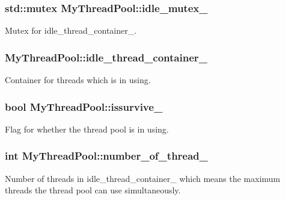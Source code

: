 \subsubsection[{\texorpdfstring{idle\+\_\+mutex\+\_\+}{idle_mutex_}}]{\setlength{\rightskip}{0pt plus 5cm}std\+::mutex My\+Thread\+Pool\+::idle\+\_\+mutex\+\_\+\hspace{0.3cm}{\ttfamily [private]}}\hypertarget{classMyThreadPool_a9fa6f068a873d87b9967db1ae79f9e36}{}\label{classMyThreadPool_a9fa6f068a873d87b9967db1ae79f9e36}
Mutex for idle\+\_\+thread\+\_\+container\+\_\+. 
\subsubsection[{\texorpdfstring{idle\+\_\+thread\+\_\+container\+\_\+}{idle_thread_container_}}]{ My\+Thread\+Pool\+::idle\+\_\+thread\+\_\+container\+\_\+\hspace{0.3cm}{\ttfamily [private]}}\hypertarget{classMyThreadPool_a9bcb3aebe659a0e30d9ab80ace409716}{}\label{classMyThreadPool_a9bcb3aebe659a0e30d9ab80ace409716}
Container for threads which is in using. 
\subsubsection[{\texorpdfstring{issurvive\+\_\+}{issurvive_}}]{\setlength{\rightskip}{0pt plus 5cm}bool My\+Thread\+Pool\+::issurvive\+\_\+\hspace{0.3cm}{\ttfamily [private]}}\hypertarget{classMyThreadPool_acd750861efa8ae618fc9c88bea24382d}{}\label{classMyThreadPool_acd750861efa8ae618fc9c88bea24382d}
Flag for whether the thread pool is in using. 
\subsubsection[{\texorpdfstring{number\+\_\+of\+\_\+thread\+\_\+}{number_of_thread_}}]{\setlength{\rightskip}{0pt plus 5cm}int My\+Thread\+Pool\+::number\+\_\+of\+\_\+thread\+\_\+\hspace{0.3cm}{\ttfamily [private]}}\hypertarget{classMyThreadPool_ad290954c3ceb2c991732961b895098ec}{}\label{classMyThreadPool_ad290954c3ceb2c991732961b895098ec}
Number of threads in idle\+\_\+thread\+\_\+container\+\_\+ which means the maximum threads the thread pool can use simultaneously. 

